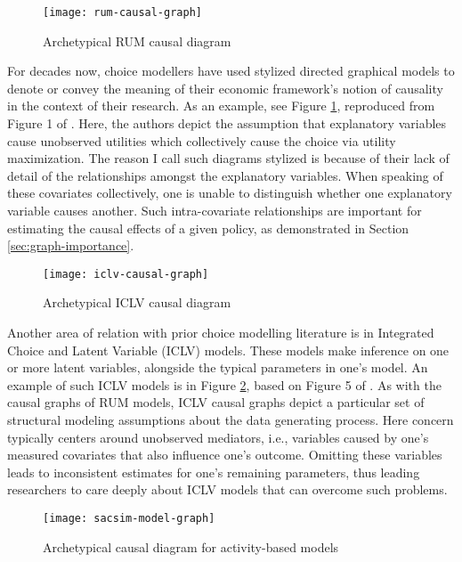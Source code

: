 \begin{figure}
   \centering
   \texttt{[image: rum-causal-graph]}
   \caption{Archetypical RUM causal diagram}
   \label{fig:example-graph-rum}
\end{figure}

For decades now, choice modellers have used stylized directed graphical models to denote or convey the meaning of their economic framework's notion of causality in the context of their research.
As an example, see Figure \ref{fig:example-graph-rum}, reproduced from Figure 1 of \citet{ben_2002_integration}.
Here, the authors depict the assumption that explanatory variables cause unobserved utilities which collectively cause the choice via utility maximization.
The reason I call such diagrams stylized is because of their lack of detail of the relationships amongst the explanatory variables.
When speaking of these covariates collectively, one is unable to distinguish whether one explanatory variable causes another.
Such intra-covariate relationships are important for estimating the causal effects of a given policy, as demonstrated in Section \ref{sec:graph-importance}.

\begin{figure}
   \centering
   \texttt{[image: iclv-causal-graph]}
   \caption{Archetypical ICLV causal diagram}
   \label{fig:example-graph-iclv}
\end{figure}

Another area of relation with prior choice modelling literature is in Integrated Choice and Latent Variable (ICLV) models.
These models make inference on one or more latent variables, alongside the typical parameters in one's model.
An example of such ICLV models is in Figure \ref{fig:example-graph-iclv}, based on Figure 5 of \citet{ben_2002_integration}.
As with the causal graphs of RUM models, ICLV causal graphs depict a particular set of structural modeling assumptions about the data generating process.
Here concern typically centers around unobserved mediators, i.e., variables caused by one's measured covariates that also influence one's outcome.
Omitting these variables leads to inconsistent estimates for one's remaining parameters, thus leading researchers to care deeply about ICLV models that can overcome such problems.

\begin{figure}
   \centering
   \texttt{[image: sacsim-model-graph]}
   \caption{Archetypical causal diagram for activity-based models}
   \label{fig:example-graph-abm}
\end{figure}

